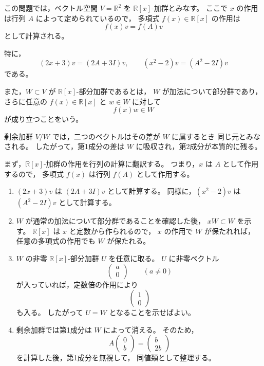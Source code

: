 \begin{background}
	この問題では，ベクトル空間 \(V=\mathbb{R}^2\) を
	\(\mathbb{R}[x]\)-加群とみなす。
	ここで \(x\) の作用は行列 \(A\) によって定められているので，
	多項式 \(f(x)\in\mathbb{R}[x]\) の作用は
	\[
	f(x)v=f(A)v
	\]
	として計算される。
	
	特に，
	\[
	(2x+3)v=(2A+3I)v,
	\qquad
	(x^2-2)v=(A^2-2I)v
	\]
	である。
	
	また，\(W\subset V\) が \(\mathbb{R}[x]\)-部分加群であるとは，
	\(W\) が加法について部分群であり，さらに任意の
	\(f(x)\in\mathbb{R}[x]\) と \(w\in W\) に対して
	\[
	f(x)w\in W
	\]
	が成り立つことをいう。
	
	剰余加群 \(V/W\) では，二つのベクトルはその差が \(W\) に属するとき
	同じ元とみなされる。
	したがって，第1成分の差は \(W\) に吸収され，第2成分が本質的に残る。
\end{background}

\begin{strategy}
	まず，\(\mathbb{R}[x]\)-加群の作用を行列の計算に翻訳する。
	つまり，\(x\) は \(A\) として作用するので，
	多項式 \(f(x)\) は行列 \(f(A)\) として作用する。
	
	\begin{enumerate}
		\item[(1)]
		\((2x+3)v\) は \((2A+3I)v\) として計算する。
		同様に，\((x^2-2)v\) は \((A^2-2I)v\) として計算する。
		
		\item[(2)]
		\(W\) が通常の加法について部分群であることを確認した後，
		\(xW\subset W\) を示す。
		\(\mathbb{R}[x]\) は \(x\) と定数から作られるので，
		\(x\) の作用で \(W\) が保たれれば，
		任意の多項式の作用でも \(W\) が保たれる。
		
		\item[(3)]
		\(W\) の非零 \(\mathbb{R}[x]\)-部分加群 \(U\) を任意に取る。
		\(U\) に非零ベクトル
		\[
		\begin{pmatrix}
			a\\
			0
		\end{pmatrix}
		\qquad (a\neq 0)
		\]
		が入っていれば，定数倍の作用により
		\[
		\begin{pmatrix}
			1\\
			0
		\end{pmatrix}
		\]
		も入る。
		したがって \(U=W\) となることを示せばよい。
		
		\item[(4)]
		剰余加群では第1成分は \(W\) によって消える。
		そのため，
		\[
		A
		\begin{pmatrix}
			0\\
			b
		\end{pmatrix}
		=
		\begin{pmatrix}
			b\\
			2b
		\end{pmatrix}
		\]
		を計算した後，第1成分を無視して，
		同値類として整理する。
	\end{enumerate}
\end{strategy}